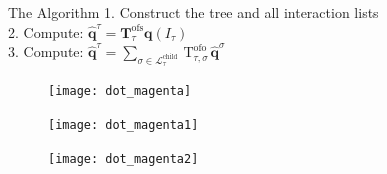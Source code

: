  \begin{frame}{The Algorithm}
  1. Construct the tree and all interaction lists\\
  \vspace{3mm}
  2. Compute: $\hat{\mathbf{q}}^{\tau}=\mathbf{T}_{\tau}^{\mathrm{ofs}} \mathbf{q}\left(I_{\tau}\right)$\\
  \vspace{3mm}
  3. Compute: $\hat{\mathbf{q}}^{\tau}=\sum_{\sigma \in \mathcal{L}_{\tau}^{\text {child }}} \mathrm{T}_{\tau, \sigma}^{\text {ofo }} \hat{\mathbf{q}}^{\sigma}$\\

  \vspace{6mm}
  \begin{figure}[!tbp]
    \centering
    \begin{minipage}[b]{0.3\textwidth}
      \texttt{[image: dot\_magenta]}
    \end{minipage}
    \hfill
    \begin{minipage}[b]{0.3\textwidth}
      \texttt{[image: dot\_magenta1]}
    \end{minipage}
    \hfill
    \begin{minipage}[b]{0.3\textwidth}
      \texttt{[image: dot\_magenta2]}
    \end{minipage}
  \end{figure}

\end{frame}


